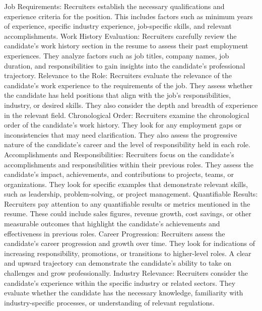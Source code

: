\documentclass[12 pt, oneside]{book}
\begin{document}
\newline
Job Requirements: Recruiters establish the necessary qualifications and experience criteria for the position. This includes factors such as minimum years of experience, specific industry experience, job-specific skills, and relevant accomplishments.
\newline
Work History Evaluation: Recruiters carefully review the candidate's work history section in the resume to assess their past employment experiences. They analyze factors such as job titles, company names, job duration, and responsibilities to gain insights into the candidate's professional trajectory.
\newline
Relevance to the Role: Recruiters evaluate the relevance of the candidate's work experience to the requirements of the job. They assess whether the candidate has held positions that align with the job's responsibilities, industry, or desired skills. They also consider the depth and breadth of experience in the relevant field.
\newline
Chronological Order: Recruiters examine the chronological order of the candidate's work history. They look for any employment gaps or inconsistencies that may need clarification. They also assess the progressive nature of the candidate's career and the level of responsibility held in each role.
\newline
Accomplishments and Responsibilities: Recruiters focus on the candidate's accomplishments and responsibilities within their previous roles. They assess the candidate's impact, achievements, and contributions to projects, teams, or organizations. They look for specific examples that demonstrate relevant skills, such as leadership, problem-solving, or project management.
\newline
Quantifiable Results: Recruiters pay attention to any quantifiable results or metrics mentioned in the resume. These could include sales figures, revenue growth, cost savings, or other measurable outcomes that highlight the candidate's achievements and effectiveness in previous roles.
\newline
Career Progression: Recruiters assess the candidate's career progression and growth over time. They look for indications of increasing responsibility, promotions, or transitions to higher-level roles. A clear and upward trajectory can demonstrate the candidate's ability to take on challenges and grow professionally.
\newline
Industry Relevance: Recruiters consider the candidate's experience within the specific industry or related sectors. They evaluate whether the candidate has the necessary knowledge, familiarity with industry-specific processes, or understanding of relevant regulations.
\end{document}
